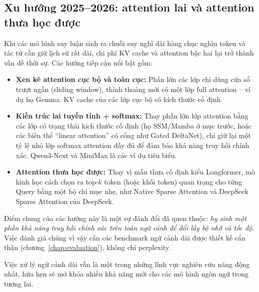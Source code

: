 \begin{center}
\label{fig:ring_attention}
\end{center}

\subsection{Xu hướng 2025--2026: attention lai và attention thưa học được}
\label{ssec:hybrid_attention_trends}
Khi các mô hình suy luận sinh ra chuỗi suy nghĩ dài hàng chục nghìn token và tác tử cần giữ lịch sử rất dài, chi phí KV cache và attention bậc hai lại trở thành vấn đề thời sự. Các hướng tiếp cận nổi bật gồm:
\begin{itemize}
	\item \textbf{Xen kẽ attention cục bộ và toàn cục:} Phần lớn các lớp chỉ dùng cửa sổ trượt ngắn (sliding window), thỉnh thoảng mới có một lớp full attention -- ví dụ họ Gemma. KV cache của các lớp cục bộ có kích thước cố định.
	\item \textbf{Kiến trúc lai tuyến tính + softmax:} Thay phần lớn lớp attention bằng các lớp có trạng thái kích thước cố định (họ SSM/Mamba ở mục trước, hoặc các biến thể “linear attention” có cổng như Gated DeltaNet), chỉ giữ lại một tỷ lệ nhỏ lớp softmax attention đầy đủ để đảm bảo khả năng truy hồi chính xác. Qwen3-Next và MiniMax là các ví dụ tiêu biểu.
	\item \textbf{Attention thưa học được:} Thay vì mẫu thưa cố định kiểu Longformer, mô hình học cách chọn ra top-$k$ token (hoặc khối token) quan trọng cho từng Query bằng một bộ chỉ mục nhẹ, như Native Sparse Attention và DeepSeek Sparse Attention của DeepSeek.
\end{itemize}
Điểm chung của các hướng này là một sự đánh đổi đã quen thuộc: \emph{hy sinh một phần khả năng truy hồi chính xác trên toàn ngữ cảnh để đổi lấy bộ nhớ và tốc độ}. Việc đánh giá chúng vì vậy cần các benchmark ngữ cảnh dài được thiết kế cẩn thận (chương~\ref{chap:evaluation}), không chỉ perplexity.

Việc xử lý ngữ cảnh dài vẫn là một trong những lĩnh vực nghiên cứu năng động nhất, hứa hẹn sẽ mở khóa nhiều khả năng mới cho các mô hình ngôn ngữ trong tương lai.